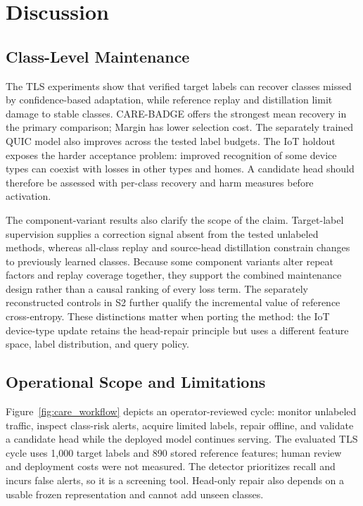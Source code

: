 \documentclass[journal]{IEEEtran}
\begin{document}
\section{Discussion}
\label{sec:discussion}

\subsection{Class-Level Maintenance}
\label{sec:discussion_efficacy}
The TLS experiments show that verified target labels can recover classes missed by confidence-based adaptation, while reference replay and distillation limit damage to stable classes. CARE-BADGE offers the strongest mean recovery in the primary comparison; Margin has lower selection cost. The separately trained QUIC model also improves across the tested label budgets. The IoT holdout exposes the harder acceptance problem: improved recognition of some device types can coexist with losses in other types and homes. A candidate head should therefore be assessed with per-class recovery and harm measures before activation.

The component-variant results also clarify the scope of the claim. Target-label supervision supplies a correction signal absent from the tested unlabeled methods, whereas all-class replay and source-head distillation constrain changes to previously learned classes. Because some component variants alter repeat factors and replay coverage together, they support the combined maintenance design rather than a causal ranking of every loss term. The separately reconstructed controls in S2 further qualify the incremental value of reference cross-entropy. These distinctions matter when porting the method: the IoT device-type update retains the head-repair principle but uses a different feature space, label distribution, and query policy.

\subsection{Operational Scope and Limitations}
\label{sec:discussion_deployment}
\label{sec:discussion_iot}
\label{sec:discussion_limitations}
Figure~\ref{fig:care_workflow} depicts an operator-reviewed cycle: monitor unlabeled traffic, inspect class-risk alerts, acquire limited labels, repair offline, and validate a candidate head while the deployed model continues serving. The evaluated TLS cycle uses 1{,}000 target labels and 890 stored reference features; human review and deployment costs were not measured. The detector prioritizes recall and incurs false alerts, so it is a screening tool. Head-only repair also depends on a usable frozen representation and cannot add unseen classes.
\end{document}
